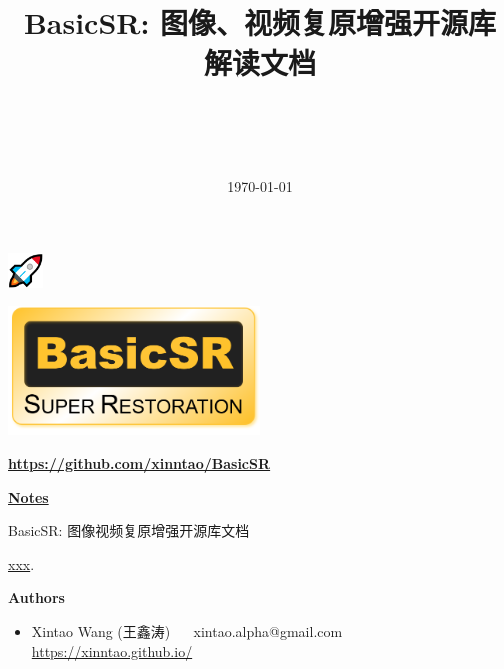 \documentclass[a4paper, 12pt, oneside]{memoir}
\title{
\vspace{4cm}
\normalfont \normalsize 
\horrule{0.5pt} \\[0.4cm]
\huge \begin{CJK}{UTF8}{gbsn} BasicSR: 图像、视频复原增强开源库 
\\ 解读文档\end{CJK}
\horrule{2pt} \\[0.5cm]
}
\date{\normalsize\today}
\begin{document}
\maketitle
\thispagestyle{empty}

\vspace{-6.3cm}
\begin{adjustwidth}{0.5cm}{}
    \includegraphics[width=0.07\textwidth]{figures/rocket_logo.png}
\end{adjustwidth}
\vspace{5cm}

\begin{center}
    \includegraphics[width=0.5\textwidth]{figures/basicsr_logo.png}
\end{center}
\begin{center}
	\underline{\textbf{\url{https://github.com/xinntao/BasicSR}}}
\end{center}

\vspace{2.2cm}
\begin{center}
\textcolor{ChadBlue}{\underline{\textbf{Notes}}}
\end{center}

\vspace{0.5cm}
\begin{CJK}{UTF8}{gbsn} BasicSR: 图像视频复原增强开源库文档\end{CJK}

\vspace{0.3cm}
 \href{https://github.com/FortsAndMills/RL-Theory-book}{xxx}.



\newpage
\begin{CJK}{UTF8}{gbsn}

{\Large\textbf{Authors}}

\begin{itemize}
	\item Xintao Wang (王鑫涛) ~~ xintao.alpha@gmail.com ~~ \url{https://xinntao.github.io/}
\end{itemize}


	
\newpage
	
\tableofcontents*
\end{CJK}
\end{document}
